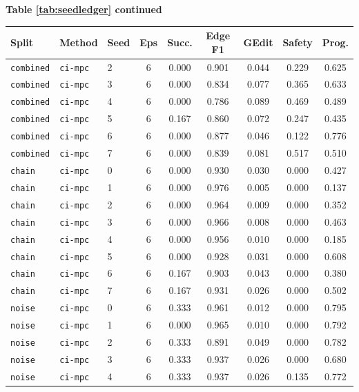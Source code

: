 \documentclass{article}
\begin{document}
\begin{center}
\textbf{Table \ref{tab:seedledger} continued}\\[0.4ex]
\begin{tabular}{lllcccccc}
\toprule
Split & Method & Seed & Eps & Succ. & Edge F1 & GEdit & Safety & Prog. \\
\midrule
\texttt{combined} & \texttt{ci-mpc} & 2 & 6 & 0.000 & 0.901 & 0.044 & 0.229 & 0.625 \\
\texttt{combined} & \texttt{ci-mpc} & 3 & 6 & 0.000 & 0.834 & 0.077 & 0.365 & 0.633 \\
\texttt{combined} & \texttt{ci-mpc} & 4 & 6 & 0.000 & 0.786 & 0.089 & 0.469 & 0.489 \\
\texttt{combined} & \texttt{ci-mpc} & 5 & 6 & 0.167 & 0.860 & 0.072 & 0.247 & 0.435 \\
\texttt{combined} & \texttt{ci-mpc} & 6 & 6 & 0.000 & 0.877 & 0.046 & 0.122 & 0.776 \\
\texttt{combined} & \texttt{ci-mpc} & 7 & 6 & 0.000 & 0.839 & 0.081 & 0.517 & 0.510 \\
\texttt{chain} & \texttt{ci-mpc} & 0 & 6 & 0.000 & 0.930 & 0.030 & 0.000 & 0.427 \\
\texttt{chain} & \texttt{ci-mpc} & 1 & 6 & 0.000 & 0.976 & 0.005 & 0.000 & 0.137 \\
\texttt{chain} & \texttt{ci-mpc} & 2 & 6 & 0.000 & 0.964 & 0.009 & 0.000 & 0.352 \\
\texttt{chain} & \texttt{ci-mpc} & 3 & 6 & 0.000 & 0.966 & 0.008 & 0.000 & 0.463 \\
\texttt{chain} & \texttt{ci-mpc} & 4 & 6 & 0.000 & 0.956 & 0.010 & 0.000 & 0.185 \\
\texttt{chain} & \texttt{ci-mpc} & 5 & 6 & 0.000 & 0.928 & 0.031 & 0.000 & 0.608 \\
\texttt{chain} & \texttt{ci-mpc} & 6 & 6 & 0.167 & 0.903 & 0.043 & 0.000 & 0.380 \\
\texttt{chain} & \texttt{ci-mpc} & 7 & 6 & 0.167 & 0.931 & 0.026 & 0.000 & 0.502 \\
\texttt{noise} & \texttt{ci-mpc} & 0 & 6 & 0.333 & 0.961 & 0.012 & 0.000 & 0.795 \\
\texttt{noise} & \texttt{ci-mpc} & 1 & 6 & 0.000 & 0.965 & 0.010 & 0.000 & 0.792 \\
\texttt{noise} & \texttt{ci-mpc} & 2 & 6 & 0.333 & 0.891 & 0.049 & 0.000 & 0.782 \\
\texttt{noise} & \texttt{ci-mpc} & 3 & 6 & 0.333 & 0.937 & 0.026 & 0.000 & 0.680 \\
\texttt{noise} & \texttt{ci-mpc} & 4 & 6 & 0.333 & 0.937 & 0.026 & 0.135 & 0.772 \\

\end{tabular}
\end{center}
\end{document}
